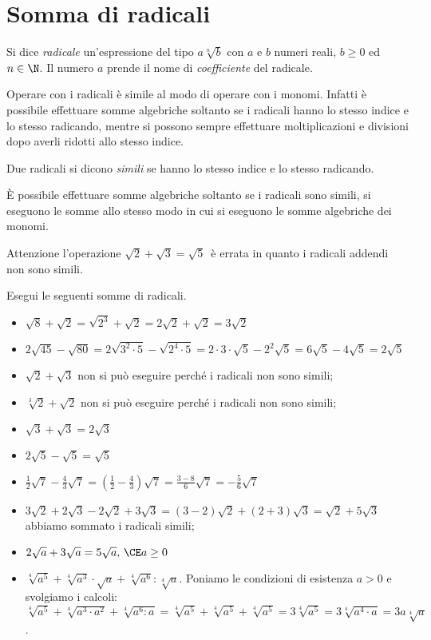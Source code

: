 \section{Somma di radicali}
\label{sec:radici_somma}

Si dice \emph{radicale} un'espressione del tipo \(a\sqrt[n]b\) con \(a\) e 
\(b\) 
numeri reali, \(b{\geq}0\) ed \(n\in \N\). Il numero \(a\) prende il nome di 
\emph{coefficiente} del radicale.

Operare con i radicali è simile al modo di operare con i monomi. Infatti è 
possibile effettuare somme algebriche soltanto se i radicali hanno lo stesso 
indice e lo stesso radicando, mentre si possono sempre effettuare 
moltiplicazioni e divisioni dopo averli ridotti allo stesso indice.
\begin{definizione}
 Due radicali si dicono \emph{simili} se hanno lo stesso indice e lo stesso 
 radicando.
\end{definizione}

È possibile effettuare somme algebriche soltanto se i radicali sono simili, 
si eseguono le somme allo stesso modo in cui si eseguono le somme algebriche 
dei monomi.

Attenzione l'operazione \(\sqrt 2+\sqrt 3=\sqrt 5\)\, è errata in quanto i 
radicali addendi non sono simili.
\begin{exrig}
 \begin{esempio}
Esegui le seguenti somme di radicali.
\begin{itemize}
 \item \(\sqrt 8+\sqrt 2=\sqrt{2^3}+\sqrt 2=2\sqrt 2+\sqrt 2=3\sqrt 2\)
 \item \(2\sqrt{45}-\sqrt{80}=2\sqrt{3^2\cdot 5}-\sqrt{2^4\cdot 5}=
        2\cdot 3\cdot \sqrt 5-2^2\sqrt 5=6\sqrt 5-4\sqrt 5=2\sqrt 5\)
 \item \(\sqrt 2+\sqrt 3\)
  non si può eseguire perché i radicali non sono simili;
 \item \(\sqrt[3]2+\sqrt 2\)
  non si può eseguire perché i radicali non sono simili;
 \item \(\sqrt 3+\sqrt 3=2\sqrt 3\)
 \item \(2\sqrt 5-\sqrt 5=\sqrt 5\)
 \item \(\frac 1 2\sqrt 7-\frac 4 3\sqrt 7=
        \left(\frac 1 2-\frac 4 3\right)\sqrt 7=\frac{3-8} 6\sqrt 7=
        -\frac 5 6\sqrt 7\)
 \item \(3\sqrt 2+2\sqrt 3-2\sqrt 2+3\sqrt 3=(3-2)\sqrt 2+(2+3)\sqrt 3=
        \sqrt 2+5\sqrt 3\) abbiamo sommato i radicali simili;
 \item \(2\sqrt a+3\sqrt a=5\sqrt a,\,\CE a\ge 0\)
 \item \(\sqrt[4]{a^5}+\sqrt[4]{a^3}\cdot \sqrt a+\sqrt[4]{a^6}:\sqrt[4]a\). 
  Poniamo le condizioni di esistenza \(a>0\) e svolgiamo i calcoli: 
  \(\sqrt[4]{a^5}+\sqrt[4]{a^3\cdot a^2}+\sqrt[4]{a^6:a}=
   \sqrt[4]{a^5}+\sqrt[4]{a^5}+\sqrt[4]{a^5}=3\sqrt[4]{a^5}=
   3\sqrt[4]{a^4\cdot a}=3a\sqrt[4]a\).
\end{itemize}
 \end{esempio}
\end{exrig}

